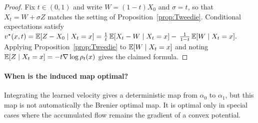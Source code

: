 \begin{proof}
Fix $t\in(0,1)$ and write $W=(1-t)X_0$ and $\sigma=t$, so that
$X_t=W+\sigma Z$ matches the setting of Proposition~\ref{prop:Tweedie}.
Conditional expectations satisfy
$
v^\star(x,t)
= \mathbb{E}[Z-X_0\mid X_t=x]
= \frac{1}{t}\,\mathbb{E}[X_t-W\mid X_t=x]
-\,\frac{1}{1-t}\,\mathbb{E}[W\mid X_t=x].
$
Applying Proposition~\ref{prop:Tweedie} to $\mathbb{E}[W\mid X_t=x]$ and
noting $\mathbb{E}[Z\mid X_t=x]=-t\nabla\log\rho_t(x)$
gives the claimed formula.
\end{proof}
\paragraph{When is the induced map optimal?}
Integrating the learned velocity gives a deterministic map from $\alpha_0$ to $\alpha_1$, but this map is not automatically the Brenier optimal map. It is optimal only in special cases where the accumulated flow remains the gradient of a convex potential.

